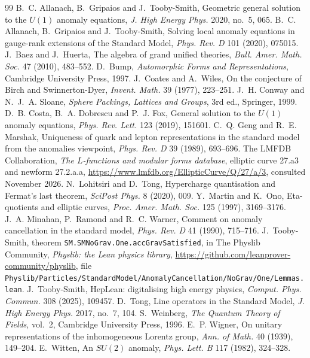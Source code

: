 \documentclass[11pt]{article}
\begin{document}
\begin{thebibliography}{99}
 B.~C. Allanach, B.~Gripaios and J.~Tooby-Smith, Geometric general solution to the $U(1)$ anomaly equations, \emph{J. High Energy Phys.} 2020, no.~5, 065.
 B.~C. Allanach, B.~Gripaios and J.~Tooby-Smith, Solving local anomaly equations in gauge-rank extensions of the Standard Model, \emph{Phys. Rev. D} 101 (2020), 075015.
 J.~Baez and J.~Huerta, The algebra of grand unified theories, \emph{Bull. Amer. Math. Soc.} 47 (2010), 483--552.
 D.~Bump, \emph{Automorphic Forms and Representations}, Cambridge University Press, 1997.
 J.~Coates and A.~Wiles, On the conjecture of Birch and Swinnerton-Dyer, \emph{Invent. Math.} 39 (1977), 223--251.
 J.~H. Conway and N.~J.~A. Sloane, \emph{Sphere Packings, Lattices and Groups}, 3rd ed., Springer, 1999.
 D.~B. Costa, B.~A. Dobrescu and P.~J. Fox, General solution to the $U(1)$ anomaly equations, \emph{Phys. Rev. Lett.} 123 (2019), 151601.
 C.~Q. Geng and R.~E. Marshak, Uniqueness of quark and lepton representations in the standard model from the anomalies viewpoint, \emph{Phys. Rev. D} 39 (1989), 693--696.
 The LMFDB Collaboration, \emph{The $L$-functions and modular forms database}, elliptic curve 27.a3 and newform 27.2.a.a, \url{https://www.lmfdb.org/EllipticCurve/Q/27/a/3}, consulted November 2026.
 N.~Lohitsiri and D.~Tong, Hypercharge quantisation and Fermat's last theorem, \emph{SciPost Phys.} 8 (2020), 009.
 Y.~Martin and K.~Ono, Eta-quotients and elliptic curves, \emph{Proc. Amer. Math. Soc.} 125 (1997), 3169--3176.
 J.~A. Minahan, P.~Ramond and R.~C. Warner, Comment on anomaly cancellation in the standard model, \emph{Phys. Rev. D} 41 (1990), 715--716.
 J.~Tooby-Smith, theorem \texttt{SM.SMNoGrav.One.accGravSatisfied}, in The Physlib Community, \emph{Physlib: the Lean physics library}, \url{https://github.com/leanprover-community/physlib}, file \nolinkurl{Physlib/Particles/StandardModel/AnomalyCancellation/NoGrav/One/Lemmas.lean}.
 J.~Tooby-Smith, HepLean: digitalising high energy physics, \emph{Comput. Phys. Commun.} 308 (2025), 109457.
 D.~Tong, Line operators in the Standard Model, \emph{J. High Energy Phys.} 2017, no.~7, 104.
 S.~Weinberg, \emph{The Quantum Theory of Fields}, vol.~2, Cambridge University Press, 1996.
 E.~P. Wigner, On unitary representations of the inhomogeneous Lorentz group, \emph{Ann. of Math.} 40 (1939), 149--204.
 E.~Witten, An $SU(2)$ anomaly, \emph{Phys. Lett. B} 117 (1982), 324--328.
\end{thebibliography}
\end{document}
